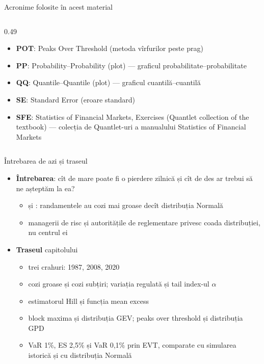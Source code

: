 \begin{frame}{Acronime folosite în acest material}
\begin{columns}[T]
\begin{column}{0.49\textwidth}
\begin{itemize}
    \item \textbf{POT}: Peaks Over Threshold (metoda vîrfurilor peste prag)
    \item \textbf{PP}: Probability–Probability (plot) — graficul probabilitate–probabilitate
    \item \textbf{QQ}: Quantile–Quantile (plot) — graficul cuantilă–cuantilă
    \item \textbf{SE}: Standard Error (eroare standard)
    \item \textbf{SFE}: Statistics of Financial Markets, Exercises (Quantlet collection of the textbook) — colecția de Quantlet-uri a manualului Statistics of Financial Markets
\end{itemize}
\end{column}
\end{columns}
\end{frame}

\begin{frame}{Întrebarea de azi și traseul}
\itemsize{\small}
\begin{itemize}
    \item \textbf{Întrebarea}: cît de mare poate fi o pierdere zilnică și cît de des ar trebui să ne așteptăm la ea?
    \begin{itemize}
        \item {} și : randamentele au cozi mai groase decît distribuția Normală
        \item managerii de risc și autoritățile de reglementare privesc coada distribuției, nu centrul ei
    \end{itemize}
    \item \textbf{Traseul} capitolului
    \begin{itemize}
        \item trei crahuri: 1987, 2008, 2020
        \item cozi groase și cozi subțiri; variația regulată și tail index-ul $\alpha$
        \item estimatorul Hill și funcția mean excess
        \item block maxima și distribuția GEV; peaks over threshold și distribuția GPD
        \item VaR 1\%, ES 2,5\% și VaR 0,1\% prin EVT, comparate cu simularea istorică și cu distribuția Normală
    \end{itemize}
\end{itemize}
\end{frame}

